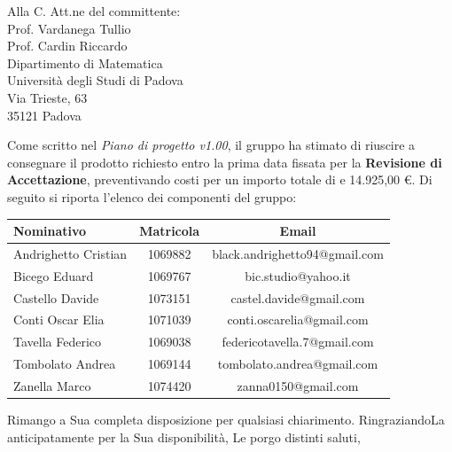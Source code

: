 \documentclass[a4paper,12pt]{letteracdp}
\begin{document}
\begin{letter}{
		Alla C. Att.ne del committente: \\
		Prof. Vardanega Tullio \\
		Prof. Cardin Riccardo \\
		Dipartimento di Matematica \\
		Università degli Studi di Padova \\
		Via Trieste, 63 \\
		35121 Padova}
\begin{itemize}
\end{itemize}

Come scritto nel \textit{Piano di progetto v1.00}, il gruppo ha stimato di riuscire a consegnare il prodotto richiesto entro la prima data fissata per la \textbf{Revisione di Accettazione}, preventivando costi per un importo totale di e 14.925,00 \euro. Di seguito si riporta l'elenco dei componenti del gruppo:

\begin{center}
		\begin{tabular}{l c c}
			\toprule
			\textbf{Nominativo} & \textbf{Matricola} & \textbf{Email} \\
			\midrule
			Andrighetto Cristian & 1069882 & black.andrighetto94@gmail.com \\
			Bicego Eduard & 1069767 & bic.studio@yahoo.it  \\
			Castello Davide	& 1073151 &	 castel.davide@gmail.com\\
			Conti Oscar Elia & 1071039 & conti.oscarelia@gmail.com \\
			Tavella Federico & 1069038 & federicotavella.7@gmail.com\\
			Tombolato Andrea & 1069144 & tombolato.andrea@gmail.com	 \\
			Zanella Marco & 1074420 & zanna0150@gmail.com \\
			\bottomrule
		\end{tabular}
\end{center}
		
		\closing{Rimango a Sua completa disposizione per qualsiasi chiarimento. RingraziandoLa anticipatamente per la Sua disponibilità, Le porgo distinti saluti,}
		
	\end{letter}
\end{document}
